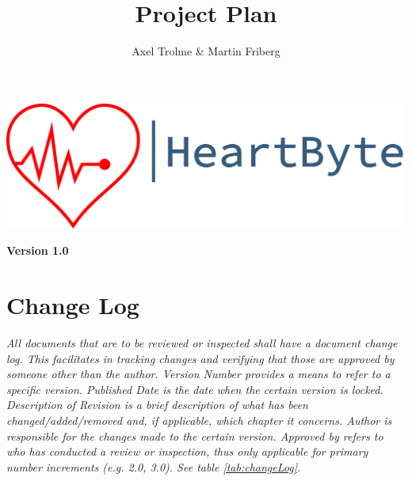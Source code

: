 \documentclass[12pt]{article}
\title{\Huge Project Plan}
\author{Axel Trolme \& Martin Friberg}
\begin{document}
\maketitle
\vfill
\includegraphics[width=\linewidth]{Pictures/logo_heartbyte_transparent_v_1_1 (1)}

\vfill
\begin{center}
    \textbf{{\large Version 1.0}}
\end{center}
\clearpage

\section{Change Log}
	\textit{All documents that are to be reviewed or inspected shall have a document change log. This facilitates in tracking changes and verifying that those are approved by someone other than the author. Version Number provides a means to refer to a specific version. Published Date is the date when the certain version is locked. Description of Revision is a brief description of what has been changed/added/removed and, if applicable, which chapter it concerns. Author is responsible for the changes made to the certain version. Approved by refers to who has conducted a review or inspection, thus only applicable for primary number increments (e.g. 2.0, 3.0). See table \ref{tab:changeLog}.}
	
\end{document}
